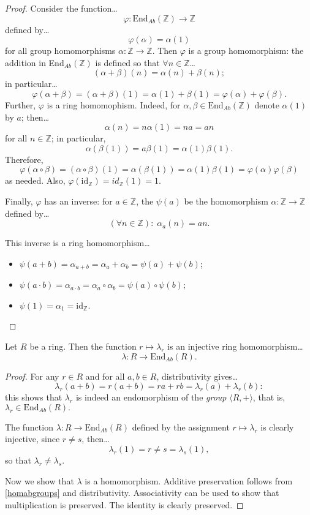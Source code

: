 \begin{proof}
Consider the function\dots
$$\varphi : \textrm{End}_{Ab}(\mathbb{Z}) \rightarrow \mathbb{Z}$$
defined by\dots
$$\varphi(\alpha) = \alpha(1)$$
for all group homomorphisms $\alpha: \mathbb{Z} \rightarrow \mathbb{Z}$. Then $\varphi$ is a group
homomorphism: the addition in End$_{Ab}(\mathbb{Z})$ is defined so that $\forall n \in \mathbb{Z}$\dots
$$(\alpha + \beta)(n) = \alpha(n) + \beta(n);$$
in particular\dots
$$\varphi(\alpha + \beta) = (\alpha + \beta)(1) = \alpha(1) + \beta(1) = \varphi(\alpha) + \varphi(\beta).$$
Further, $\varphi$ is a ring homomophism. Indeed, for $\alpha, \beta \in \textrm{End}_{Ab}(\mathbb{Z})$ denote
$\alpha(1)$ by $a$; then\dots
$$\alpha(n) = n\alpha(1) = na = an$$
for all $n \in \mathbb{Z}$; in particular,
$$\alpha(\beta(1)) = a\beta(1) = \alpha(1)\beta(1).$$
Therefore,
$$\varphi(\alpha \circ \beta) = (\alpha \circ \beta)(1) = \alpha(\beta(1)) = \alpha(1)\beta(1) = \varphi(\alpha)\varphi(\beta)$$
as needed. Also, $\varphi(\textrm{id}_{\mathbb{Z}}) = id_{\mathbb{Z}}(1) = 1.$

Finally, $\varphi$ has an inverse: for $a \in \mathbb{Z}$, the $\psi(a)$ be the homomorphism $\alpha : \mathbb{Z} \rightarrow \mathbb{Z}$
defined by\dots
$$(\forall n \in \mathbb{Z}): \; \alpha_a(n) = an.$$

This inverse is a ring homomorphism\dots
\begin{itemize}
  \item $\psi(a+b) = \alpha_{a+b} = \alpha_{a} + \alpha_{b} = \psi(a) + \psi(b)$;
  \item $\psi(a \cdot b) = \alpha_{a \cdot b} = \alpha_{a} \circ \alpha_{b} = \psi(a) \circ \psi(b)$;
  \item $\psi(1) = \alpha_1 = \textrm{id}_{\mathbb{Z}}$.
\end{itemize}
\end{proof}

\begin{proposition}
Let $R$ be a ring. Then the function $r \mapsto \lambda_r$ is an injective ring homomorphism\dots
$$\lambda : R \rightarrow \textrm{End}_{Ab}(R).$$
\end{proposition}

\begin{proof}
For any $r \in R$ and for all $a,b \in R$, distributivity gives\dots
$$\lambda_r(a+b) = r(a+b) = ra + rb = \lambda_r(a) + \lambda_r(b):$$
this shows that $\lambda_r$ is indeed an endomorphism of the \emph{group} $\langle R,+ \rangle$, that is,
$\lambda_r \in \textrm{End}_{Ab}(R).$

The function $\lambda : R \rightarrow \textrm{End}_{Ab}(R)$ defined by the assignment $r \mapsto \lambda_r$
is clearly injective, since $r \neq s$, then\dots
$$\lambda_r(1) = r \neq s = \lambda_s(1),$$
so that $\lambda_r \neq \lambda_s$.

Now we show that $\lambda$ is a homomorphism. Additive preservation follows from \ref{homabgroups} and distributivity.
Associativity can be used to show that multiplication is preserved. The identity is clearly preserved.
\end{proof}
